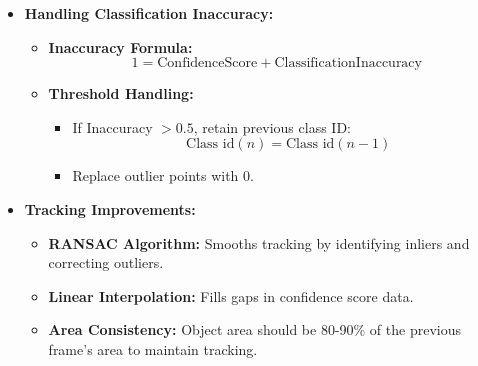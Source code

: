{\begin{enumerate}
\begin{itemize}
\begin{itemize}
        \item \textbf{Max Value:} 1 (100\% confidence)
    \end{itemize}
    \item \textbf{Handling Classification Inaccuracy:}
    \begin{itemize}
        \item \textbf{Inaccuracy Formula:}
        \[
        1 = \text{ConfidenceScore} + \text{ClassificationInaccuracy}
        \]
        \item \textbf{Threshold Handling:} 
        \begin{itemize}
            \item If Inaccuracy \( > 0.5 \), retain previous class ID:
            \[
            \text{Class id}(n) = \text{Class id}(n-1)
            \]
            \item Replace outlier points with 0.
        \end{itemize}
    \end{itemize}
    \item \textbf{Tracking Improvements:}
    \begin{itemize}
        \item \textbf{RANSAC Algorithm:} Smooths tracking by identifying inliers and correcting outliers.
        \item \textbf{Linear Interpolation:} Fills gaps in confidence score data.
        \item \textbf{Area Consistency:} Object area should be 80-90\% of the previous frame’s area to maintain tracking.
    \end{itemize}
\end{itemize}


\end{enumerate}}
